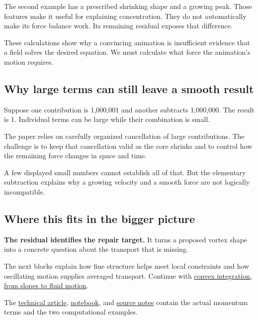 \documentclass[
  english,
  11pt,
]{article}
\begin{document}
The second example has a prescribed shrinking shape and a growing peak.
Those features make it useful for explaining concentration. They do not
automatically make its force balance work. Its remaining residual
exposes that difference.

These calculations show why a convincing animation is insufficient
evidence that a field solves the desired equation. We must calculate
what force the animation's motion requires.

\subsection{Why large terms can still leave a smooth
result}\label{why-large-terms-can-still-leave-a-smooth-result}

Suppose one contribution is 1,000,001 and another subtracts 1,000,000.
The result is 1. Individual terms can be large while their combination
is small.

The paper relies on carefully organized cancellation of large
contributions. The challenge is to keep that cancellation valid as the
core shrinks and to control how the remaining force changes in space and
time.

A few displayed small numbers cannot establish all of that. But the
elementary subtraction explains why a growing velocity and a smooth
force are not logically incompatible.

\subsection{Where this fits in the bigger
picture}\label{where-this-fits-in-the-bigger-picture}

\textbf{The residual identifies the repair target.} It turns a proposed
vortex shape into a concrete question about the transport that is
missing.

The next blocks explain how fine structure helps meet local constraints
and how oscillating motion supplies averaged transport. Continue with
\href{../convex-integration/article.html}{convex integration, from
slopes to fluid motion}.

The \href{technical-article.html}{technical article},
\href{../../code/d3_residual/study.ipynb}{notebook}, and
\href{source-notes.md}{source notes} contain the actual momentum terms
and the two computational examples.
\end{document}

